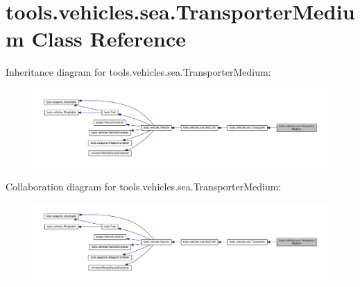 \hypertarget{classtools_1_1vehicles_1_1sea_1_1_transporter_medium}{}\section{tools.\+vehicles.\+sea.\+Transporter\+Medium Class Reference}
\label{classtools_1_1vehicles_1_1sea_1_1_transporter_medium}


Inheritance diagram for tools.\+vehicles.\+sea.\+Transporter\+Medium\+:
\nopagebreak
\begin{figure}[H]
\begin{center}
\leavevmode
\includegraphics[width=350pt]{classtools_1_1vehicles_1_1sea_1_1_transporter_medium__inherit__graph}
\end{center}
\end{figure}


Collaboration diagram for tools.\+vehicles.\+sea.\+Transporter\+Medium\+:
\nopagebreak
\begin{figure}[H]
\begin{center}
\leavevmode
\includegraphics[width=350pt]{classtools_1_1vehicles_1_1sea_1_1_transporter_medium__coll__graph}
\end{center}
\end{figure}
